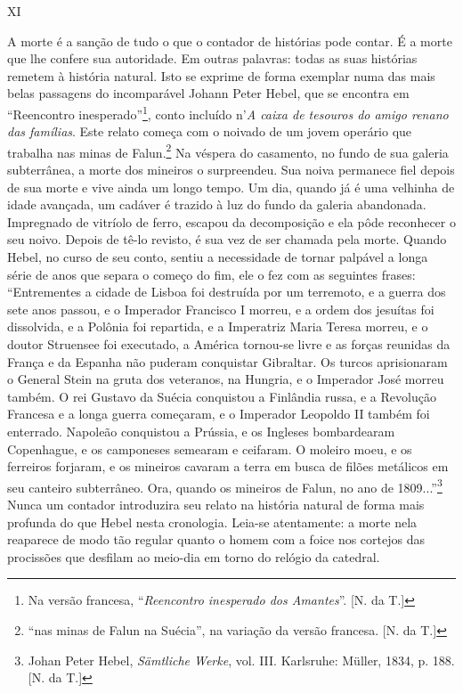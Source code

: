 XI

A morte é a sanção de tudo o que o contador de histórias pode contar. É
a morte que lhe confere sua autoridade. Em outras palavras: todas as
suas histórias remetem à história natural. Isto se exprime de forma
exemplar numa das mais belas passagens do incomparável Johann Peter
Hebel, que se encontra em ``Reencontro inesperado''\footnote{Na versão
  francesa, ``\emph{Reencontro inesperado dos Amantes}''. {[}N. da T.{]}},
conto incluído n'\emph{A caixa de tesouros do amigo renano das
famílias}. Este relato começa com o noivado de um jovem operário que
trabalha nas minas de Falun.\footnote{``nas minas de Falun na Suécia'',
  na variação da versão francesa. {[}N. da T.{]}} Na véspera do
casamento, no fundo de sua galeria subterrânea, a morte dos mineiros o
surpreendeu. Sua noiva permanece fiel depois de sua morte e vive ainda
um longo tempo. Um dia, quando já é uma velhinha de idade avançada, um
cadáver é trazido à luz do fundo da galeria abandonada. Impregnado de
vitríolo de ferro, escapou da decomposição e ela pôde reconhecer o seu
noivo. Depois de tê-lo revisto, é sua vez de ser chamada pela morte.
Quando Hebel, no curso de seu conto, sentiu a necessidade de tornar
palpável a longa série de anos que separa o começo do fim, ele o fez com
as seguintes frases: ``Entrementes a cidade de Lisboa foi destruída por
um terremoto, e a guerra dos sete anos passou, e o Imperador Francisco I
morreu, e a ordem dos jesuítas foi dissolvida, e a Polônia foi
repartida, e a Imperatriz Maria Teresa morreu, e o doutor Struensee foi
executado, a América tornou-se livre e as forças reunidas da França e da
Espanha não puderam conquistar Gibraltar. Os turcos aprisionaram o
General Stein na gruta dos veteranos, na Hungria, e o Imperador José
morreu também. O rei Gustavo da Suécia conquistou a Finlândia russa, e a
Revolução Francesa e a longa guerra começaram, e o Imperador Leopoldo II
também foi enterrado. Napoleão conquistou a Prússia, e os Ingleses
bombardearam Copenhague, e os camponeses semearam e ceifaram. O moleiro
moeu, e os ferreiros forjaram, e os mineiros cavaram a terra em busca de
filões metálicos em seu canteiro subterrâneo. Ora, quando os mineiros de
Falun, no ano de 1809...''\footnote{Johan Peter Hebel, \emph{Sämtliche
  Werke}, vol. III. Karlsruhe: Müller, 1834, p. 188. {[}N. da T.{]}}
Nunca um contador introduzira seu relato na história natural de forma
mais profunda do que Hebel nesta cronologia. Leia-se atentamente: a
morte nela reaparece de modo tão regular quanto o homem com a foice nos
cortejos das procissões que desfilam ao meio-dia em torno do relógio da
catedral.

